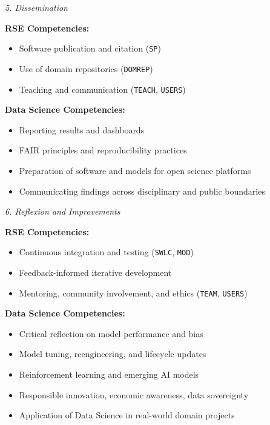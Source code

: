 \documentclass[
        english,biblatex
    ]{lni}
\providecommand{\tightlist}{%
    \setlength{\itemsep}{0pt}\setlength{\parskip}{0pt}}
\begin{document}
    \emph{5. Dissemination}

    \textbf{RSE Competencies:}

    \begin{itemize}
    \tightlist
    \item
      Software publication and citation (\texttt{SP})
    \item
      Use of domain repositories (\texttt{DOMREP})
    \item
      Teaching and communication (\texttt{TEACH}, \texttt{USERS})
    \end{itemize}

    \textbf{Data Science Competencies:}

    \begin{itemize}
    \tightlist
    \item
      Reporting results and dashboards
    \item
      FAIR principles and reproducibility practices
    \item
      Preparation of software and models for open science platforms
    \item
      Communicating findings across disciplinary and public boundaries
    \end{itemize}

    \emph{6. Reflexion and Improvements}

    \textbf{RSE Competencies:}

    \begin{itemize}
    \tightlist
    \item
      Continuous integration and testing (\texttt{SWLC}, \texttt{MOD})
    \item
      Feedback-informed iterative development
    \item
      Mentoring, community involvement, and ethics (\texttt{TEAM},
      \texttt{USERS})
    \end{itemize}

    \textbf{Data Science Competencies:}

    \begin{itemize}
    \tightlist
    \item
      Critical reflection on model performance and bias
    \item
      Model tuning, reengineering, and lifecycle updates
    \item
      Reinforcement learning and emerging AI models
    \item
      Responsible innovation, economic awareness, data sovereignty
    \item
      Application of Data Science in real-world domain projects
    \end{itemize}
\end{document}
